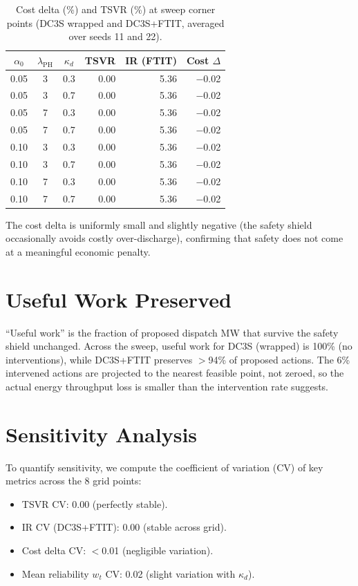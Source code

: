 \begin{table}[ht]
\centering
\caption{Cost delta (\%) and TSVR (\%) at sweep corner points
  (DC3S wrapped and DC3S+FTIT, averaged over seeds 11 and 22).}
\label{tab:sweep-cost}
\begin{tabular}{cccrrr}
\toprule
$\alpha_0$ & $\lambda_{\mathrm{PH}}$ & $\kappa_d$ &
  \textbf{TSVR} & \textbf{IR (FTIT)} & \textbf{Cost $\Delta$} \\
\midrule
0.05 & 3 & 0.3 & 0.00 & 5.36 & $-$0.02 \\
0.05 & 3 & 0.7 & 0.00 & 5.36 & $-$0.02 \\
0.05 & 7 & 0.3 & 0.00 & 5.36 & $-$0.02 \\
0.05 & 7 & 0.7 & 0.00 & 5.36 & $-$0.02 \\
0.10 & 3 & 0.3 & 0.00 & 5.36 & $-$0.02 \\
0.10 & 3 & 0.7 & 0.00 & 5.36 & $-$0.02 \\
0.10 & 7 & 0.3 & 0.00 & 5.36 & $-$0.02 \\
0.10 & 7 & 0.7 & 0.00 & 5.36 & $-$0.02 \\
\bottomrule
\end{tabular}
\end{table}

The cost delta is uniformly small and slightly negative (the safety
shield occasionally avoids costly over-discharge), confirming that
safety does not come at a meaningful economic penalty.

\section{Useful Work Preserved}

``Useful work'' is the fraction of proposed dispatch MW that survive
the safety shield unchanged.  Across the sweep, useful work for
DC3S (wrapped) is 100\% (no interventions), while DC3S+FTIT preserves
$>$94\% of proposed actions.  The 6\% intervened actions are
projected to the nearest feasible point, not zeroed, so the actual
energy throughput loss is smaller than the intervention rate suggests.

\section{Sensitivity Analysis}

To quantify sensitivity, we compute the coefficient of variation (CV)
of key metrics across the 8 grid points:

\begin{itemize}
  \item TSVR CV: 0.00 (perfectly stable).
  \item IR CV (DC3S+FTIT): 0.00 (stable across grid).
  \item Cost delta CV: $<$0.01 (negligible variation).
  \item Mean reliability $w_t$ CV: 0.02 (slight variation with
    $\kappa_d$).
\end{itemize}

